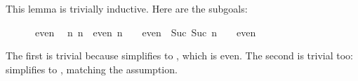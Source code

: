 \begin{isabellebody}
\begin{isamarkuptxt}
This lemma is trivially inductive.  Here are the subgoals:
\begin{isabelle}%
\ {}{}\ {}\ {}\ {}\ {}\ even\isanewline
\ {}{}\ {}n{}\ {}n\ {}\ even{}\ n\ {}\ {}\ {}\ even{}\ {}\ Suc\ {}Suc\ n{}\ {}\ {}\ {}\ even%
\end{isabelle}
The first is trivial because  simplifies to , which is
even.  The second is trivial too:  simplifies to
, matching the assumption.%


\end{isamarkuptxt}
\end{isabellebody}

